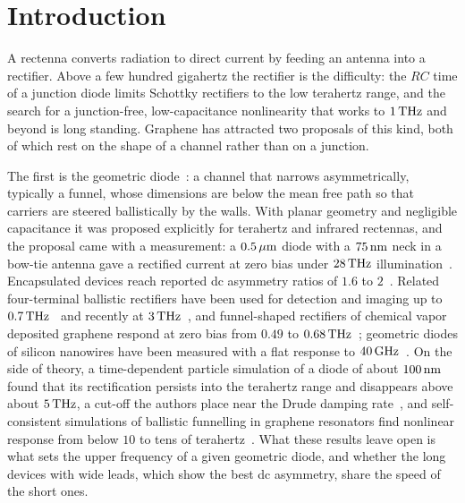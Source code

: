 \section{Introduction}
\label{sec:intro}

A rectenna converts radiation to direct current by feeding an antenna into a
rectifier. Above a few hundred gigahertz the rectifier is the difficulty: the
$RC$ time of a junction diode limits Schottky rectifiers to the low terahertz
range, and the search for a junction-free, low-capacitance nonlinearity that
works to $1\,\mathrm{THz}$ and beyond is long standing. Graphene has attracted two
proposals of this kind, both of which rest on the shape of a channel rather
than on a junction.

The first is the geometric diode~\cite{moddel2012ultrahigh,zhu2013graphene,dragoman2013geometrically}: a channel
that narrows asymmetrically, typically a funnel, whose dimensions are below the
mean free path so that carriers are steered ballistically by the walls. With
planar geometry and negligible capacitance it was proposed explicitly for
terahertz and infrared rectennas, and the proposal came with a measurement:
a $0.5\,\mu\mathrm{m}$ diode with a $75\,\mathrm{nm}$ neck in a bow-tie antenna gave a rectified
current at zero bias under $28\,\mathrm{THz}$ illumination~\cite{zhu2013graphene}.
Encapsulated devices reach reported dc asymmetry ratios of $1.6$ to
$2$~\cite{nguyen2021geometric,wang2024graphene}. Related four-terminal
ballistic rectifiers have been used for detection and imaging up to
$0.7\,\mathrm{THz}$~\cite{auton2016graphene,auton2017terahertz} and recently at
$3\,\mathrm{THz}$~\cite{shi2026ballistic}, and funnel-shaped rectifiers of chemical
vapor deposited graphene respond at zero bias from $0.49$ to
$0.68\,\mathrm{THz}$~\cite{hemmetter2026enhanced}; geometric diodes of silicon
nanowires have been measured with a flat response to
$40\,\mathrm{GHz}$~\cite{custer2020ratcheting}. On the side of theory, a
time-dependent particle simulation of a diode of about $100\,\mathrm{nm}$ found that
its rectification persists into the terahertz range and disappears above
about $5\,\mathrm{THz}$, a cut-off the authors place near the Drude damping
rate~\cite{stearns2020high}, and self-consistent simulations of ballistic
funnelling in graphene resonators find nonlinear response from below $10$ to
tens of terahertz~\cite{do2025nonlinear}. What these results leave open is
what sets the upper frequency of a given geometric diode, and whether the
long devices with wide leads, which show the best dc asymmetry, share the
speed of the short ones.

